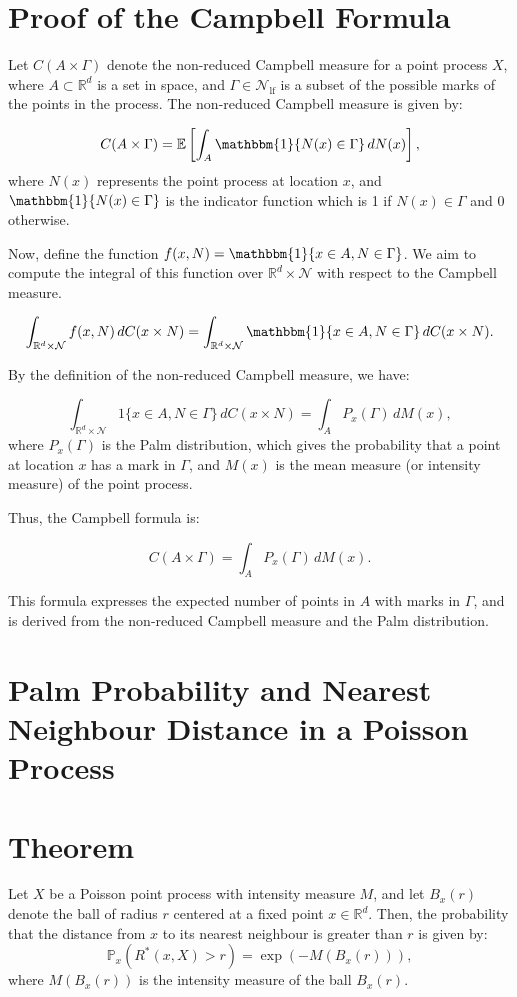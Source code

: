 \documentclass{article}
\begin{document}
\section*{Proof of the Campbell Formula}

Let \( C(A \times \Gamma) \) denote the non-reduced Campbell measure for a point process \( X \), where \( A \subset \mathbb{R}^d \) is a set in space, and \( \Gamma \in \mathcal{N}_{\text{lf}} \) is a subset of the possible marks of the points in the process. The non-reduced Campbell measure is given by:

\[
C(A \times \Gamma) = \mathbb{E}\left[ \int_A \mathbbm{1}\{ N(x) \in \Gamma \} \, dN(x) \right],
\]
where \( N(x) \) represents the point process at location \( x \), and \( \mathbbm{1}\{ N(x) \in \Gamma \} \) is the indicator function which is 1 if \( N(x) \in \Gamma \) and 0 otherwise.

\noindent Now, define the function \( f(x, N) = \mathbbm{1}\{ x \in A, N \in \Gamma \} \). We aim to compute the integral of this function over \( \mathbb{R}^d \times \mathcal{N} \) with respect to the Campbell measure.

\[
\int_{\mathbb{R}^d \times \mathcal{N}} f(x, N) \, dC(x \times N) = \int_{\mathbb{R}^d \times \mathcal{N}} \mathbbm{1}\{ x \in A, N \in \Gamma \} \, dC(x \times N).
\]

By the definition of the non-reduced Campbell measure, we have:

\[
\int_{\mathbb{R}^d \times \mathcal{N}} 1\{ x \in A, N \in \Gamma \} \, dC(x \times N) = \int_A P_x(\Gamma) \, dM(x),
\]
where \( P_x(\Gamma) \) is the Palm distribution, which gives the probability that a point at location \( x \) has a mark in \( \Gamma \), and \( M(x) \) is the mean measure (or intensity measure) of the point process. 

Thus, the Campbell formula is:

\[
C(A \times \Gamma) = \int_A P_x(\Gamma) \, dM(x).
\]

This formula expresses the expected number of points in \( A \) with marks in \( \Gamma \), and is derived from the non-reduced Campbell measure and the Palm distribution.


\section*{Palm Probability and Nearest Neighbour Distance in a Poisson Process}

\section*{Theorem}
Let \( X \) be a Poisson point process with intensity measure \( M \), and let \( B_x(r) \) denote the ball of radius \( r \) centered at a fixed point \( x \in \mathbb{R}^d \). Then, the probability that the distance from \( x \) to its nearest neighbour is greater than \( r \) is given by:
\[
\mathbb{P}_x(R^*(x, X) > r) = \exp\left(-M(B_x(r))\right),
\]
where \( M(B_x(r)) \) is the intensity measure of the ball \( B_x(r) \).
\end{document}

